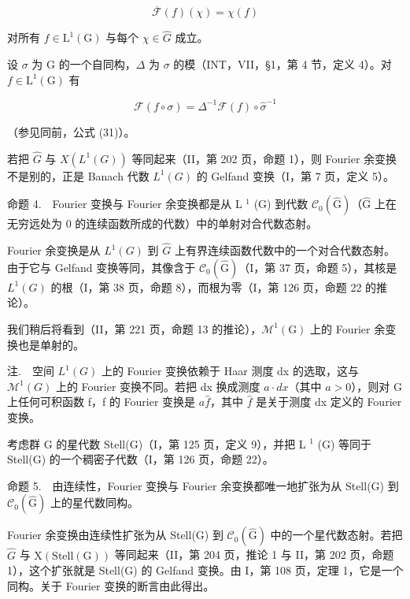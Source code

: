 \[
\overline {{\mathcal {F}}} (f) (\chi) = \chi (f)\tag{15}
\]

对所有 \(f \in \mathrm{L}^{1}(\mathrm{G})\) 与每个 \(\chi \in \widehat{G}\) 成立。

设 \(\sigma\) 为 G 的一个自同构，\(\Delta\) 为 \(\sigma\) 的模（INT，VII，§1，第 4 节，定义 4）。对 \(f \in \mathrm{L}^1(\mathrm{G})\) 有

\[
\mathcal {F} (f \circ \sigma) = \Delta^ {- 1} \mathcal {F} (f) \circ \widehat {\sigma} ^ {- 1}\tag{16}
\]

（参见同前，公式 (31)）。

若把 \(\widehat{G}\) 与 \(X(L^{1}(G))\) 等同起来（II，第 202 页，命题 1），则 Fourier 余变换不是别的，正是 Banach 代数 \(L^{1}(G)\) 的 Gelfand 变换（I，第 7 页，定义 5）。

命题 4.　Fourier 变换与 Fourier 余变换都是从 L \(^{1}\) (G) 到代数 \(\mathcal{C}_{0}(\widehat{\mathrm{G}})\)（\(\widehat{\mathrm{G}}\) 上在无穷远处为 0 的连续函数所成的代数）中的单射对合代数态射。

Fourier 余变换是从 \(L^{1}(G)\) 到 \(\widehat{G}\) 上有界连续函数代数中的一个对合代数态射。由于它与 Gelfand 变换等同，其像含于 \(\mathcal{C}_{0}(\widehat{\mathrm{G}})\)（I，第 37 页，命题 5），其核是 \(L^{1}(G)\) 的根（I，第 38 页，命题 8），而根为零（I，第 126 页，命题 22 的推论）。

我们稍后将看到（II，第 221 页，命题 13 的推论），\(\mathcal{M}^{1}(\mathrm{G})\) 上的 Fourier 余变换也是单射的。

注.　空间 \(L^{1}(G)\) 上的 Fourier 变换依赖于 Haar 测度 dx 的选取，这与 \(\mathcal{M}^{1}(G)\) 上的 Fourier 变换不同。若把 dx 换成测度 \(a \cdot dx\)（其中 \(a > 0\)），则对 G 上任何可积函数 f，f 的 Fourier 变换是 \(a\widehat{f}\)，其中 \(\widehat{f}\) 是关于测度 dx 定义的 Fourier 变换。

考虑群 G 的星代数 Stell(G)（I，第 125 页，定义 9），并把 L \(^{1}\) (G) 等同于 Stell(G) 的一个稠密子代数（I，第 126 页，命题 22）。

命题 5.　由连续性，Fourier 变换与 Fourier 余变换都唯一地扩张为从 Stell(G) 到 \(\mathcal{C}_{0}(\widehat{\mathrm{G}})\) 上的星代数同构。

Fourier 余变换由连续性扩张为从 Stell(G) 到 \(\mathcal{C}_{0}(\widehat{\mathrm{G}})\) 中的一个星代数态射。若把 \(\widehat{G}\) 与 \(\mathrm{X}(\mathrm{Stell}(\mathrm{G}))\) 等同起来（II，第 204 页，推论 1 与 II，第 202 页，命题 1），这个扩张就是 Stell(G) 的 Gelfand 变换。由 I，第 108 页，定理 1，它是一个同构。关于 Fourier 变换的断言由此得出。

